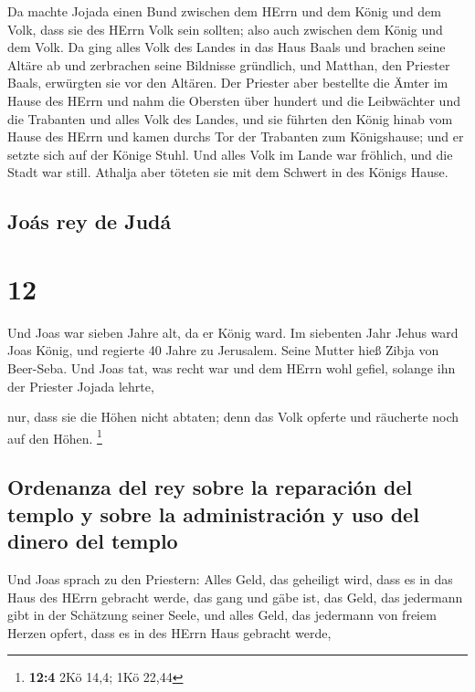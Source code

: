  Da machte Jojada einen Bund zwischen dem HErrn und dem
König und dem Volk, dass sie des HErrn Volk sein sollten; also auch
zwischen dem König und dem Volk.  Da ging alles Volk des
Landes in das Haus Baals und brachen seine Altäre ab und zerbrachen
seine Bildnisse gründlich, und Matthan, den Priester Baals, erwürgten
sie vor den Altären. Der Priester aber bestellte die Ämter im Hause des
HErrn  und nahm die Obersten über hundert und die
Leibwächter und die Trabanten und alles Volk des Landes, und sie führten
den König hinab vom Hause des HErrn und kamen durchs Tor der Trabanten
zum Königshause; und er setzte sich auf der Könige Stuhl.
 Und alles Volk im Lande war fröhlich, und die Stadt war
still. Athalja aber töteten sie mit dem Schwert in des Königs Hause.

\hypertarget{jouxe1s-rey-de-juduxe1}{%
\subsection{Joás rey de Judá}\label{jouxe1s-rey-de-juduxe1}}

\hypertarget{section-11}{%
\section{12}\label{section-11}}

 Und Joas war sieben Jahre alt, da er König ward.
 Im siebenten Jahr Jehus ward Joas König, und regierte 40
Jahre zu Jerusalem. Seine Mutter hieß Zibja von Beer-Seba.
 Und Joas tat, was recht war und dem HErrn wohl gefiel,
solange ihn der Priester Jojada lehrte,

 nur, dass sie die Höhen nicht abtaten; denn das Volk
opferte und räucherte noch auf den Höhen. \footnote{\textbf{12:4} 2Kö
  14,4; 1Kö 22,44}

\hypertarget{ordenanza-del-rey-sobre-la-reparaciuxf3n-del-templo-y-sobre-la-administraciuxf3n-y-uso-del-dinero-del-templo}{%
\subsection{Ordenanza del rey sobre la reparación del templo y sobre la
administración y uso del dinero del
templo}\label{ordenanza-del-rey-sobre-la-reparaciuxf3n-del-templo-y-sobre-la-administraciuxf3n-y-uso-del-dinero-del-templo}}

 Und Joas sprach zu den Priestern: Alles Geld, das
geheiligt wird, dass es in das Haus des HErrn gebracht werde, das gang
und gäbe ist, das Geld, das jedermann gibt in der Schätzung seiner
Seele, und alles Geld, das jedermann von freiem Herzen opfert, dass es
in des HErrn Haus gebracht werde,

